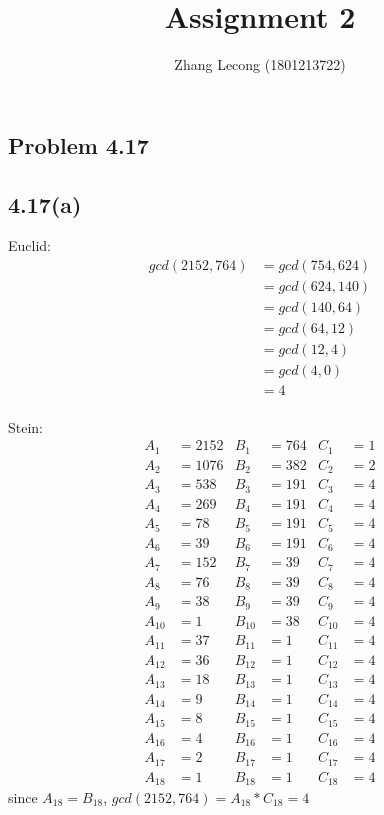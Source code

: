 \documentclass[acmlarge,screen]{acmart}
\begin{document}
\begin{CJK*}{UTF8}{gbsn}
\title{Assignment 2}
\author{Zhang Lecong (1801213722)}
\maketitle
\section{Problem 4.17}
\subsection{4.17(a)}
\begin{multicols}{2}
Euclid:
\begin{align*}
	gcd(2152, 764) &= gcd(754, 624)\\
	&= gcd(624, 140)\\
	&= gcd(140, 64)\\
	&= gcd(64, 12)\\
	&= gcd(12, 4)\\
	&= gcd(4, 0)\\
	&= 4
\end{align*}
\columnbreak \\
Stein:
\begin{align*}
	A_1&=2152 & B_1&=764 & C_1&=1\\
	A_2&=1076 & B_2&=382 & C_2&=2\\
	A_3&=538 & B_3&=191 & C_3&=4\\
	A_4&=269 & B_4&=191 & C_4&=4\\
	A_5&=78 & B_5&=191 & C_5&=4\\
	A_6&=39 & B_6&=191 & C_6&=4\\
	A_7&=152 & B_7&=39 & C_7&=4\\
	A_8&=76 & B_8&=39 & C_8&=4\\
	A_9&=38 & B_9&=39 & C_9&=4\\
	A_{10}&=1 & B_{10}&=38 & C_{10}&=4\\
	A_{11}&=37 & B_{11}&=1 & C_{11}&=4\\
	A_{12}&=36 & B_{12}&=1 & C_{12}&=4\\
	A_{13}&=18 & B_{13}&=1 & C_{13}&=4\\
	A_{14}&=9 & B_{14}&=1 & C_{14}&=4\\
	A_{15}&=8 & B_{15}&=1 & C_{15}&=4\\
	A_{16}&=4 & B_{16}&=1 & C_{16}&=4\\
	A_{17}&=2 & B_{17}&=1 & C_{17}&=4\\
	A_{18}&=1 & B_{18}&=1 & C_{18}&=4
\end{align*}
since $A_{18}=B_{18}$, $gcd(2152, 764)=A_{18}*C_{18}=4$
\end{multicols}

\end{CJK*}
\end{document}
